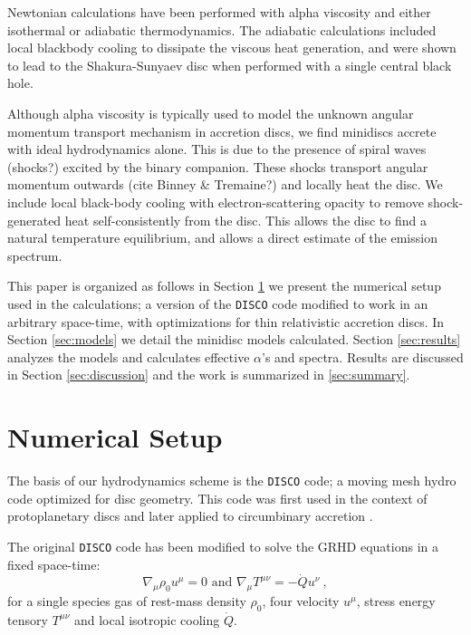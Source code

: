 \documentclass{emulateapj}
\newcommand{\DISCO}{{\texttt{DISCO}}}
\begin{document}
Newtonian calculations have been performed with alpha viscosity and either isothermal \citep{Farris14} or adiabatic \citep{Farris15A, Farris15B} thermodynamics. The adiabatic calculations included local blackbody cooling to dissipate the
viscous heat generation, and were shown to lead to the Shakura-Sunyaev disc
when performed with a single central black hole.

Although alpha viscosity is typically used to model the unknown angular 
momentum transport mechanism in accretion discs, we find minidiscs accrete with
ideal hydrodynamics alone.  This is due to the presence of spiral waves (shocks?) excited by the binary companion. These shocks transport angular momentum outwards (cite Binney \& Tremaine?) and locally heat the disc. We include local 
black-body cooling with electron-scattering opacity to remove shock-generated
heat self-consistently from the disc.  This allows the disc to find a natural
temperature equilibrium, and allows a direct estimate of the emission spectrum.

This paper is organized as follows in Section \ref{sec:numerics} we present the
numerical setup used in the calculations; a version of the \DISCO{} code 
modified to work in an arbitrary space-time, with optimizations for thin 
relativistic accretion discs.  In Section \ref{sec:models} we detail the 
minidisc models calculated.  Section \ref{sec:results} analyzes the models and
calculates effective $\alpha$'s and spectra. Results are discussed in Section \ref{sec:discussion} and the work is summarized in \ref{sec:summary}.


\section{Numerical Setup}
\label{sec:numerics}

The basis of our hydrodynamics scheme is the \DISCO{} code; a moving mesh hydro
code optimized for disc geometry. This code was first used in the context of
protoplanetary discs \citep{Duffell12, Duffell13, Duffell14} and later applied 
to circumbinary accretion \citep{Farris14, Farris15A, Farris15B}. 

The original \DISCO{} code has been modified to solve the GRHD equations in a 
fixed space-time:
\begin{equation}
    \nabla_\mu \rho_0 u^\mu = 0 \text{ and } \nabla_\mu T^{\mu\nu} = -\dot{Q} u^\nu\ , \label{eq:GRHD}
\end{equation}
for a single species gas of rest-mass density $\rho_0$, four velocity $u^\mu$, 
stress energy tensory $T^{\mu\nu}$ and local isotropic cooling $\dot{Q}$.
\end{document}
